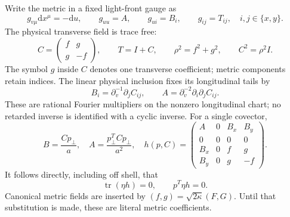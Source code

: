 \documentclass[11pt]{article}
\newcommand{\tr}{\operatorname{tr}}
\newcommand{\dd}{\mathrm d}
\begin{document}
Write the metric in a fixed light-front gauge as
\begin{equation}
 g_{v\mu}\dd x^\mu=-\dd u,\qquad
 g_{uu}=A,\qquad g_{ui}=B_i,\qquad g_{ij}=T_{ij},
 \quad i,j\in\{x,y\}.
 \label{eq:lfmetric}
\end{equation}
The physical transverse field is trace free:
\begin{equation}
 C=\begin{pmatrix}f&g\\g&-f\end{pmatrix},\qquad
 T=I+C,\qquad \rho^2=f^2+g^2,\qquad C^2=\rho^2 I.
 \label{eq:C}
\end{equation}
The symbol \(g\) inside \(C\) denotes one transverse coefficient; metric components retain indices.
The linear physical inclusion fixes its longitudinal tails by
\begin{equation}
 B_i=\partial_v^{-1}\partial_jC_{ij},\qquad
 A=\partial_v^{-2}\partial_i\partial_jC_{ij}.
 \label{eq:tails}
\end{equation}
These are rational Fourier multipliers on the nonzero longitudinal chart; no retarded inverse is identified with a cyclic inverse.
For a single covector,
\begin{equation}
 B=\frac{Cp_\perp}{a},\quad
 A=\frac{p_\perp^TCp_\perp}{a^2},\quad
 h(p,C)=\begin{pmatrix}
 A&0&B_x&B_y\\0&0&0&0\\B_x&0&f&g\\B_y&0&g&-f
 \end{pmatrix}.
 \label{eq:physical-h}
\end{equation}
It follows directly, including off shell, that
\begin{equation}
 \tr(\eta h)=0,\qquad p^T\eta h=0.
 \label{eq:TT}
\end{equation}
Canonical metric fields are inserted by \((f,g)=\sqrt{2\kappa}(F,G)\).
Until that substitution is made, these are literal metric coefficients.
\end{document}
